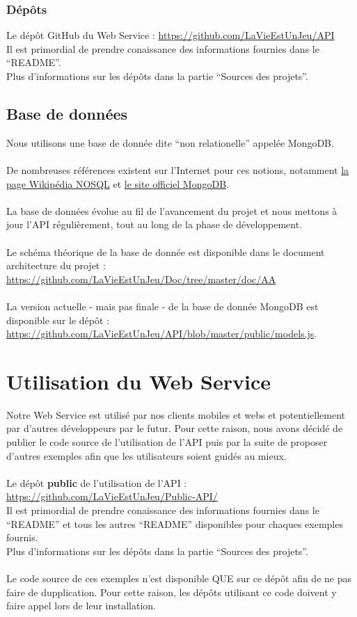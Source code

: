 \documentclass{life-fr}
\begin{document}
\subsubsection{Dépôts}

Le dépôt GitHub du Web Service : \url{https://github.com/LaVieEstUnJeu/API}\\
Il est primordial de prendre conaissance des informations fournies dans le
``README''.\\
Plus d'informations sur les dépôts dans la partie ``Sources des projets''.

\subsection{Base de données}

Nous utilisons une base de donnée dite ``non relationelle'' appelée MongoDB.\\
\\
De nombreuses références existent sur l'Internet pour ces notions, notamment
\href{http://fr.wikipedia.org/wiki/NoSQL}{la page Wikipédia NOSQL} et
\href{http://www.mongodb.org/}{le site officiel MongoDB}.\\
\\
La base de données évolue au fil de l'avancement du projet et nous mettons
à jour l'API régulièrement, tout au long de la phase de développement.\\
\\
Le schéma théorique de la base de donnée est disponible dans le document
architecture du projet : \url{https://github.com/LaVieEstUnJeu/Doc/tree/master/doc/AA}\\
\\
La version actuelle - mais pas finale - de la base de donnée MongoDB est
disponible sur le dépôt :
\url{https://github.com/LaVieEstUnJeu/API/blob/master/public/models.js}.

\section{Utilisation du Web Service}

Notre Web Service est utilisé par nos clients mobiles et webs et
potentiellement par d'autres développeurs par le futur. Pour cette raison,
nous avons décidé de publier le code source de l'utilisation de l'API
puis par la suite de proposer d'autres exemples afin que les utilisateurs
soient guidés au mieux.\\
\\
Le dépôt \textbf{public} de l'utilisation de l'API :
\url{https://github.com/LaVieEstUnJeu/Public-API/}\\
Il est primordial de prendre conaissance des informations fournies dans le
``README'' et tous les autres ``README'' disponibles pour chaques exemples
fournis.\\
Plus d'informations sur les dépôts dans la partie ``Sources des projets''.\\
\\
Le code source de ces exemples n'est disponible QUE sur ce dépôt afin de
ne pas faire de dupplication. Pour cette raison, les dépôts utilisant ce
code doivent y faire appel lors de leur installation.
\end{document}
